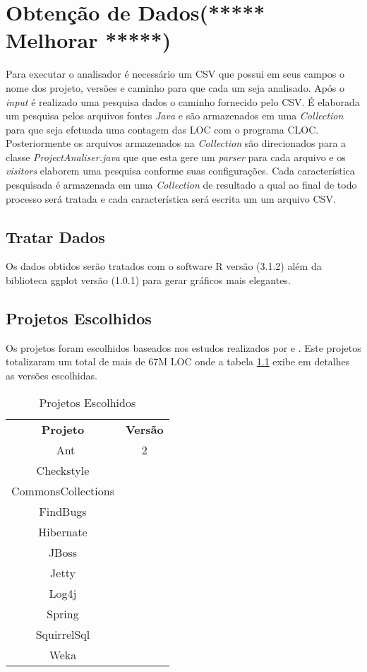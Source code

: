 \chapter{Obtenção de Dados(***** Melhorar *****)}

Para executar o analisador é necessário um \acs{CSV} que possui em seus campos o nome dos projeto, versões e caminho para que cada um seja analisado. Após o {\it input} é realizado uma pesquisa dados o caminho fornecido pelo \acs{CSV}.
É elaborada um pesquisa pelos arquivos fontes \textit{Java} e são armazenados em uma \textit{Collection} para que seja efetuada uma contagem das \acs{LOC} com o programa \acs{CLOC}.\\

Posteriormente os arquivos armazenados na \textit{Collection} são direcionados para a classe \textit{ProjectAnaliser.java} que que esta gere um \textit{parser} para cada arquivo e os \textit{visitors} elaborem uma pesquisa conforme suas configurações. Cada característica pesquisada é armazenada em uma \textit{Collection} de resultado a qual ao final de todo processo será tratada e cada característica será escrita um um arquivo \acs{CSV}.\\


\section{Tratar Dados}
Os dados obtidos serão tratados com o software R \cite{R} versão (3.1.2) além da biblioteca ggplot \cite{ggplot} versão (1.0.1) para gerar gráficos mais elegantes.


\section{Projetos Escolhidos}
Os projetos foram escolhidos baseados nos estudos realizados por \cite{Parnin:2011:JGA:1985441.1985446} e \cite{Dyer:2014:MBA:2568225.2568295}. Este projetos totalizaram um total de mais de 67M \acs{LOC} onde a tabela \ref{tab:ProjetosEscolhidos} exibe em detalhes as versões escolhidas.\\


\begin{table}[ht]
	\centering
	\caption{Projetos Escolhidos}
	\label{tab:ProjetosEscolhidos}
	\begin{tabular}{c|c}
		\hline \hline
		\textbf{Projeto}    &   \textbf{Versão}\\ \
	      Ant & 2 \\
	      Checkstyle &  \\
	      CommonsCollections &  \\
	      FindBugs &  \\
	      Hibernate & \\
	      JBoss & \\
	      Jetty & \\
	      Log4j & \\
	      Spring & \\
	      SquirrelSql & \\
	      Weka & \\
      \hline
    \end{tabular}
\end{table}